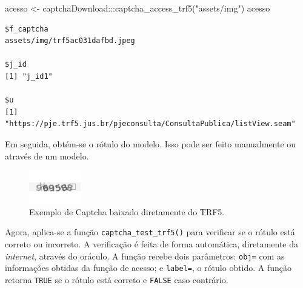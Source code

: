 \documentclass[12pt,twoside,brazilian]{book}
\newenvironment{Shaded}{\begin{snugshade}}{\end{snugshade}}
\newcommand{\CommentTok}[1]{\textcolor[rgb]{0.37,0.37,0.37}{#1}}
\newcommand{\FunctionTok}[1]{\textcolor[rgb]{0.28,0.35,0.67}{#1}}
\newcommand{\NormalTok}[1]{\textcolor[rgb]{0.00,0.23,0.31}{#1}}
\newcommand{\OtherTok}[1]{\textcolor[rgb]{0.00,0.23,0.31}{#1}}
\newcommand{\SpecialCharTok}[1]{\textcolor[rgb]{0.37,0.37,0.37}{#1}}
\newcommand{\StringTok}[1]{\textcolor[rgb]{0.13,0.47,0.30}{#1}}
\begin{document}
\begin{Shaded}
\begin{Highlighting}[]
\NormalTok{acesso }\OtherTok{\textless{}{-}}\NormalTok{ captchaDownload}\SpecialCharTok{:::}\FunctionTok{captcha\_access\_trf5}\NormalTok{(}\StringTok{"assets/img"}\NormalTok{)}
\NormalTok{acesso}
\end{Highlighting}
\end{Shaded}

\begin{verbatim}
$f_captcha
assets/img/trf5ac031dafbd.jpeg

$j_id
[1] "j_id1"

$u
[1] "https://pje.trf5.jus.br/pjeconsulta/ConsultaPublica/listView.seam"
\end{verbatim}

Em seguida, obtém-se o rótulo do modelo. Isso pode ser feito manualmente
ou através de um modelo.

\begin{Shaded}
\end{Shaded}

\begin{figure}[H]

{\centering \includegraphics[width=0.2\textwidth,height=\textheight]{./pacote_files/figure-pdf/fig-exemplo-acesso-trf5-1.pdf}

}

\caption{\label{fig-exemplo-acesso-trf5}Exemplo de Captcha baixado
diretamente do TRF5.}

\end{figure}

Agora, aplica-se a função \texttt{captcha\_test\_trf5()} para verificar
se o rótulo está correto ou incorreto. A verificação é feita de forma
automática, diretamente da \emph{internet}, através do oráculo. A função
recebe dois parâmetros: \texttt{obj=} com as informações obtidas da
função de acesso; e \texttt{label=}, o rótulo obtido. A função retorna
\texttt{TRUE} se o rótulo está correto e \texttt{FALSE} caso contrário.
\end{document}
